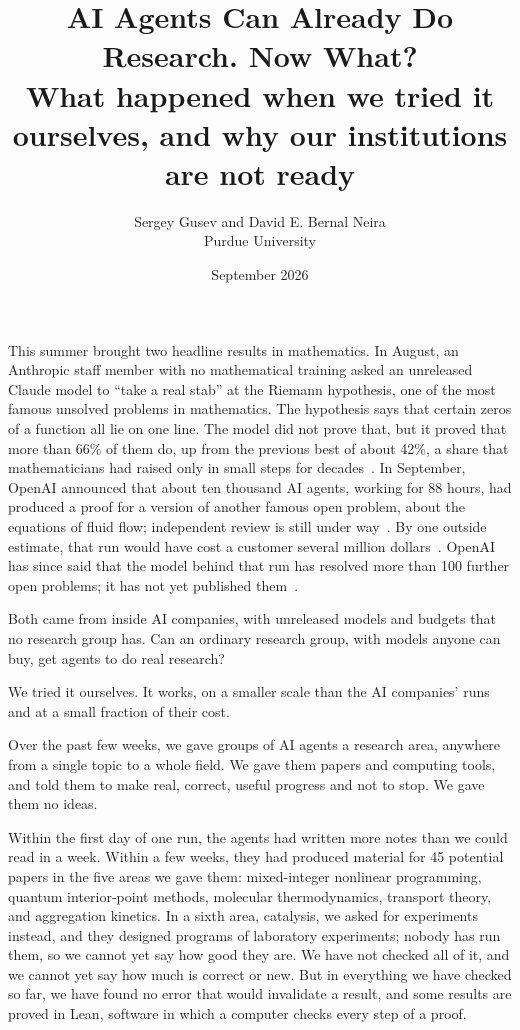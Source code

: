 \documentclass[11pt]{article}
\title{AI Agents Can Already Do Research. Now What?\\[6pt]
\large What happened when we tried it ourselves, and why our institutions are not ready}
\author{Sergey Gusev and David E. Bernal Neira\\[2pt]
\small Purdue University}
\date{September 2026}
\begin{document}
\maketitle

This summer brought two headline results in mathematics.
In August, an Anthropic staff member with no mathematical training asked an unreleased Claude model to ``take a real stab'' at the Riemann hypothesis, one of the most famous unsolved problems in mathematics.
The hypothesis says that certain zeros of a function all lie on one line.
The model did not prove that, but it proved that more than 66\% of them do, up from the previous best of about 42\%, a share that mathematicians had raised only in small steps for decades~\citep{alpoge2026-more-than-two-thirds-of}.
In September, OpenAI announced that about ten thousand AI agents, working for 88 hours, had produced a proof for a version of another famous open problem, about the equations of fluid flow; independent review is still under way~\citep{openai2026navierstokes}.
By one outside estimate, that run would have cost a customer several million dollars~\citep{duraisamy2026navierstokescost}.
OpenAI has since said that the model behind that run has resolved more than 100 further open problems; it has not yet published them~\citep{openai2026advisory}.

Both came from inside AI companies, with unreleased models and budgets that no research group has.
Can an ordinary research group, with models anyone can buy, get agents to do real research?

We tried it ourselves.
It works, on a smaller scale than the AI companies' runs and at a small fraction of their cost.

Over the past few weeks, we gave groups of AI agents a research area, anywhere from a single topic to a whole field.
We gave them papers and computing tools, and told them to make real, correct, useful progress and not to stop.
We gave them no ideas.

Within the first day of one run, the agents had written more notes than we could read in a week.
Within a few weeks, they had produced material for 45 potential papers in the five areas we gave them: mixed-integer nonlinear programming, quantum interior-point methods, molecular thermodynamics, transport theory, and aggregation kinetics.
In a sixth area, catalysis, we asked for experiments instead, and they designed programs of laboratory experiments; nobody has run them, so we cannot yet say how good they are.
We have not checked all of it, and we cannot yet say how much is correct or new.
But in everything we have checked so far, we have found no error that would invalidate a result, and some results are proved in Lean, software in which a computer checks every step of a proof.
\end{document}
